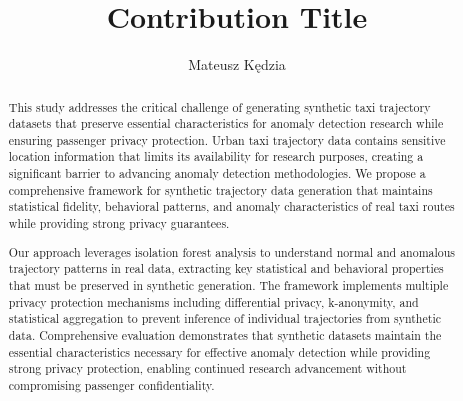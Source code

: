 \documentclass[runningheads]{llncs}
\begin{document}

\title{Contribution Title}


\author{Mateusz Kędzia}



\maketitle      %

\begin{abstract}
This study addresses the critical challenge of generating synthetic taxi trajectory datasets that preserve essential characteristics for anomaly detection research while ensuring passenger privacy protection. Urban taxi trajectory data contains sensitive location information that limits its availability for research purposes, creating a significant barrier to advancing anomaly detection methodologies. We propose a comprehensive framework for synthetic trajectory data generation that maintains statistical fidelity, behavioral patterns, and anomaly characteristics of real taxi routes while providing strong privacy guarantees.

Our approach leverages isolation forest analysis to understand normal and anomalous trajectory patterns in real data, extracting key statistical and behavioral properties that must be preserved in synthetic generation. The framework implements multiple privacy protection mechanisms including differential privacy, k-anonymity, and statistical aggregation to prevent inference of individual trajectories from synthetic data. Comprehensive evaluation demonstrates that synthetic datasets maintain the essential characteristics necessary for effective anomaly detection while providing strong privacy protection, enabling continued research advancement without compromising passenger confidentiality.

\end{abstract}
\end{document}

